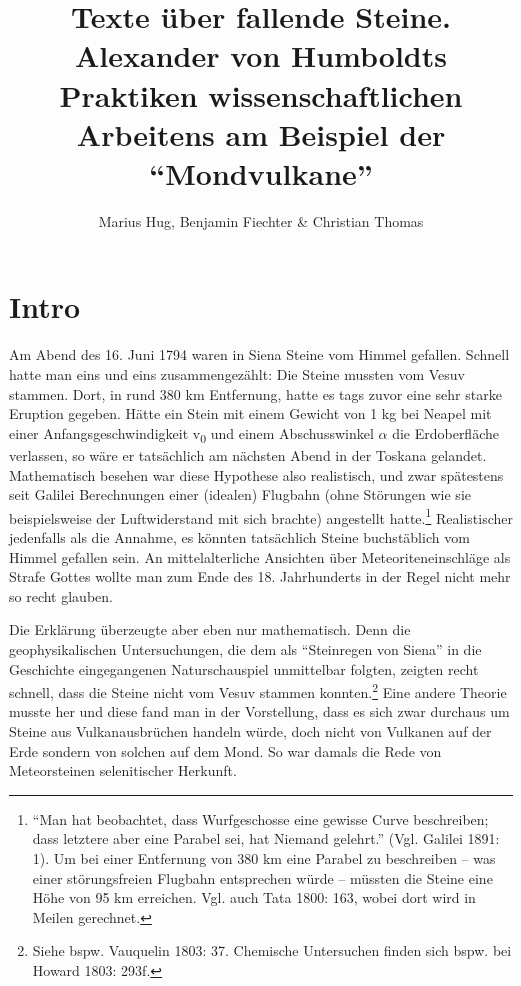 \documentclass[a4paper,
fontsize=11pt,
oneside,
numbers=noperiodatend,
parskip=half-,
bibliography=totoc,
final
]{scrartcl}
\title{\LARGE{Texte über fallende Steine. Alexander von Humboldts Praktiken wissenschaftlichen Arbeitens am Beispiel der \enquote{Mondvulkane}
}} %
\author{Marius Hug, Benjamin Fiechter \& Christian Thomas} %
\date{}
\begin{document}
\maketitle
\thispagestyle{fancyplain} 


\section*{Intro}\label{intro}

Am Abend des 16. Juni 1794 waren in Siena Steine vom Himmel gefallen.
Schnell hatte man eins und eins zusammengezählt: Die Steine mussten vom
Vesuv stammen. Dort, in rund 380 km Entfernung, hatte es tags zuvor eine
sehr starke Eruption gegeben. Hätte ein Stein mit einem Gewicht von 1 kg
bei Neapel mit einer Anfangsgeschwindigkeit v\textsubscript{0} und einem
Abschusswinkel $\alpha$ die Erdoberfläche verlassen, so wäre er tatsächlich am
nächsten Abend in der Toskana gelandet. Mathematisch besehen war diese
Hypothese also realistisch, und zwar spätestens seit Galilei
Berechnungen einer (idealen) Flugbahn (ohne Störungen wie sie
beispielsweise der Luftwiderstand mit sich brachte) angestellt
hatte.\footnote{\enquote{Man hat beobachtet, dass Wurfgeschosse eine
  gewisse Curve beschreiben; dass letztere aber eine Parabel sei, hat
  Niemand gelehrt.} (Vgl. Galilei 1891: 1). Um bei einer Entfernung von
  380 km eine Parabel zu beschreiben -- was einer störungsfreien
  Flugbahn entsprechen würde -- müssten die Steine eine Höhe von 95 km
  erreichen. Vgl. auch Tata 1800: 163, wobei dort wird in Meilen
  gerechnet.} Realistischer jedenfalls als die Annahme, es könnten
tatsächlich Steine buchstäblich vom Himmel gefallen sein. An
mittelalterliche Ansichten über Meteoriteneinschläge als Strafe Gottes
wollte man zum Ende des 18. Jahrhunderts in der Regel nicht mehr so
recht glauben.

Die Erklärung überzeugte aber eben nur mathematisch. Denn die
geophysikalischen Untersuchungen, die dem als \enquote{Steinregen von
Siena} in die Geschichte eingegangenen Naturschauspiel unmittelbar
folgten, zeigten recht schnell, dass die Steine nicht vom Vesuv stammen
konnten.\footnote{Siehe bspw. Vauquelin 1803: 37. Chemische Untersuchen
  finden sich bspw. bei Howard 1803: 293f.} Eine andere Theorie musste
her und diese fand man in der Vorstellung, dass es sich zwar durchaus um
Steine aus Vulkanausbrüchen handeln würde, doch nicht von Vulkanen auf
der Erde sondern von solchen auf dem Mond. So war damals die Rede von
Meteorsteinen selenitischer Herkunft.
\end{document}
